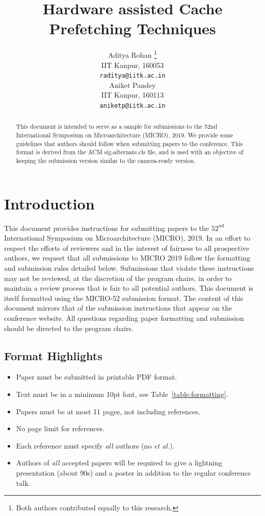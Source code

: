 \documentclass{sig-alternate}
\title{\vspace{-1ex}Hardware assisted Cache Prefetching Techniques\vspace{-4ex}}
\author{\parbox{3 in}{\centering Aditya Rohan
        \thanks{Both authors contributed equally to this research.}\\ 
        \vspace{2pt}
        IIT Kanpur, 160053\\
        \vspace{1pt}
        {\tt\large raditya@iitk.ac.in}}
        \hspace*{ 0.2 in}
        \parbox{3 in}{ \centering Aniket Pandey
        \footnotemark[1]\\
        \vspace{2pt}
        IIT Kanpur, 160113\\
        \vspace{1pt}
        {\tt\large aniketp@iitk.ac.in}}
        \hspace*{ 0.2 in}\vspace{2ex}}
\begin{document}
\maketitle
\thispagestyle{firstpage}
\pagestyle{plain}




\begin{abstract}

This document is intended to serve as a sample for submissions to the 52nd International Symposium on Microarchitecture (MICRO), 2019. We provide some guidelines that authors should follow when submitting papers to the conference.  This format is derived from the ACM sig-alternate.cls file, and is used with an objective of keeping the submission version similar to the camera-ready version.

\end{abstract}

\section{Introduction}

This document provides instructions for submitting papers to the ${52}^{nd}$ International Symposium on Microarchitecture (MICRO), 2019.  In an effort to respect the efforts of reviewers and in the interest of fairness to all prospective authors, we request that all submissions to MICRO 2019 follow the formatting and submission rules detailed below. Submissions that violate these instructions may not be reviewed, at the discretion of the program chairs, in order to maintain a review process that is fair to all potential authors. This document is itself formatted using the MICRO-52 submission format. The content of this document mirrors that of the submission instructions that appear on the conference website. All questions regarding paper formatting and submission should be directed to the program chairs.

\subsection{Format Highlights}
\begin{itemize}
\item Paper must be submitted in printable PDF format.
\item Text must be in a minimum 10pt font, see Table~\ref{table:formatting}.
\item Papers must be at most 11 pages, not including references.
\item No page limit for references.
\item Each reference must specify {\em all} authors (no {\em et al.}).
\item Authors of {\em all} accepted papers will be required to give a
lightning presentation (about 90s) and a poster in addition to the regular
conference talk.
\end{itemize}
\end{document}
